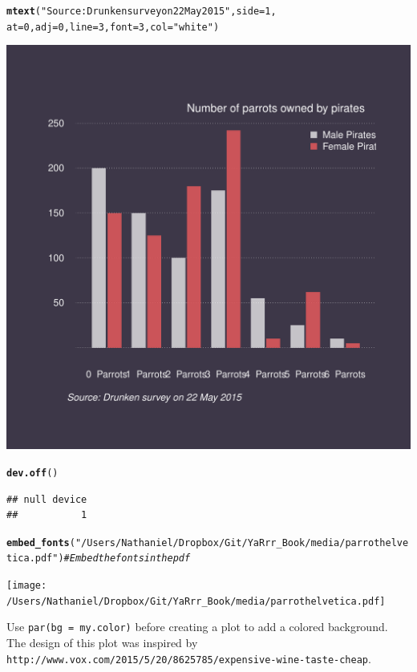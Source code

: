 \documentclass{tufte-book}\usepackage[]{graphicx}\usepackage[]{color}
\makeatletter
\def\maxwidth{ %
  \ifdim\Gin@nat@width>\linewidth
    \linewidth
  \else
    \Gin@nat@width
  \fi
}
\newcommand{\hlnum}[1]{\textcolor[rgb]{0.686,0.059,0.569}{#1}}%
\newcommand{\hlstr}[1]{\textcolor[rgb]{0.192,0.494,0.8}{#1}}%
\newcommand{\hlcom}[1]{\textcolor[rgb]{0.678,0.584,0.686}{\textit{#1}}}%
\newcommand{\hlstd}[1]{\textcolor[rgb]{0.345,0.345,0.345}{#1}}%
\newcommand{\hlkwc}[1]{\textcolor[rgb]{0.333,0.667,0.333}{#1}}%
\newcommand{\hlkwd}[1]{\textcolor[rgb]{0.737,0.353,0.396}{\textbf{#1}}}%
\newenvironment{kframe}{%
 \def\at@end@of@kframe{}%
 \ifinner\ifhmode%
  \def\at@end@of@kframe{\end{minipage}}%
  \begin{minipage}{\columnwidth}%
 \fi\fi%
 \def\FrameCommand##1{\hskip\@totalleftmargin \hskip-\fboxsep
 \colorbox{shadecolor}{##1}\hskip-\fboxsep
     \hskip-\linewidth \hskip-\@totalleftmargin \hskip\columnwidth}%
 \MakeFramed {\advance\hsize-\width
   \@totalleftmargin\z@ \linewidth\hsize
   \@setminipage}}%
 {\par\unskip\endMakeFramed%
 \at@end@of@kframe}
\newenvironment{knitrout}{}{} %
\makeatother
\begin{document}
\begin{itemize}
\begin{marginfigure}
\begin{tiny}
\begin{knitrout}
\begin{kframe}
\begin{alltt}
\hlkwd{mtext}\hlstd{(}\hlstr{"Source: Drunken survey on 22 May 2015"}\hlstd{,} \hlkwc{side} \hlstd{=} \hlnum{1}\hlstd{,}
      \hlkwc{at} \hlstd{=} \hlnum{0}\hlstd{,} \hlkwc{adj} \hlstd{=} \hlnum{0}\hlstd{,} \hlkwc{line} \hlstd{=} \hlnum{3}\hlstd{,} \hlkwc{font} \hlstd{=} \hlnum{3}\hlstd{,} \hlkwc{col} \hlstd{=} \hlstr{"white"}\hlstd{)}
\end{alltt}
\end{kframe}
\includegraphics[width=\maxwidth]{figure/unnamed-chunk-248-1} 
\begin{kframe}\begin{alltt}
\hlkwd{dev.off}\hlstd{()}
\end{alltt}
\begin{verbatim}
## null device 
##           1
\end{verbatim}
\begin{alltt}
\hlkwd{embed_fonts}\hlstd{(}\hlstr{"/Users/Nathaniel/Dropbox/Git/YaRrr_Book/media/parrothelvetica.pdf"}\hlstd{)} \hlcom{# Embed the fonts in the pdf}
\end{alltt}
\end{kframe}
\end{knitrout}
\end{tiny}
\texttt{[image: /Users/Nathaniel/Dropbox/Git/YaRrr\_Book/media/parrothelvetica.pdf]}
\caption{Use \texttt{par(bg = my.color)} before creating a plot to add a colored background. The design of this plot was inspired by \texttt{http://www.vox.com/2015/5/20/8625785/expensive-wine-taste-cheap}.}
\label{fig:coloredbackground}
\end{marginfigure}



\end{itemize}
\end{document}
